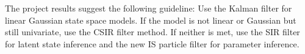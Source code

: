 \documentclass[11pt, oneside]{scrreprt}   	%
\begin{document}
The project results suggest the following guideline: Use the Kalman filter for linear Gaussian state space models. If the model is not linear or Gaussian but still univariate, use the CSIR filter method. If neither is met, use the SIR filter for latent state inference and the new IS particle filter for parameter inference.



\nocite{*}


\end{document}
